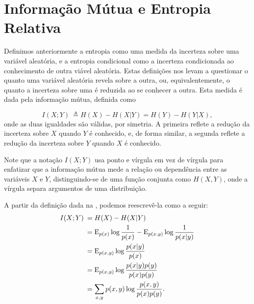 \section{Informação Mútua e Entropia Relativa}\label{sec:informacaomutua}

Definimos anteriormente a entropia como uma medida da incerteza sobre uma
variável aleatória, e a entropia condicional como a incerteza condicionada ao
conhecimento de outra viável aleatória. Estas definições nos levam a questionar
o quanto uma variável aleatória revela sobre a outra, ou, equivalentemente, o
quanto a incerteza sobre uma é reduzida ao se conhecer a outra. Esta medida é
dada pela informação mútua, definida como
\begin{definition}\label{def:infmut}
\begin{equation}\label{eq:informacaomutua-def}
I(X;Y) \: \triangleq H(X) - H(X|Y) = H(Y) - H(Y|X) ,
\end{equation}
onde as duas igualdades são válidas, por simetria.
A primeira reflete a redução da incerteza sobre $X$ quando $Y$ é conhecido,
e, de forma similar, a segunda reflete a redução da incerteza sobre $Y$ quando 
$X$ é conhecido.
\end{definition}

Note que a notação $I(X;Y)$ usa ponto e vírgula em vez de vírgula para enfatizar 
que a informação mútua mede a relação ou dependência entre as variáveis $X$ e
$Y$, distinguindo-se de uma função conjunta como $H(X,Y)$, onde a vírgula separa 
argumentos de uma distribuição.

A partir da definição dada na , podemos reescrevê-la
como a seguir:
\begin{subequations}\label{eq:informacaomutarw}
\begin{align}
 I(X;Y) \: &= H(X) - H(X|Y) \\
	   &= \E_{p(x)} \log \frac{1}{p(x)} - \E_{p(x,y)} \log \frac{1}{p(x|y)} \\
	   &= \E_{p(x,y)} \log \frac{p(x|y)}{p(x)} \\
	   &= \E_{p(x,y)} \log \frac{p(x|y)p(y)}{p(x)p(y)} \\
	   &= \sum_{x,y} p(x,y) \log \frac{p(x,y)}{p(x)p(y)} .\label{eq:infmutdivkl}
\end{align}
\end{subequations}

